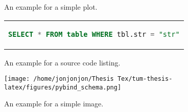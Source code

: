 \begin{figure}[htpb]
  \centering

  \exampleA
  \exampleB
  \caption[Example plot]{An example for a simple plot.}\label{fig:sample-plot}
\end{figure}

\begin{figure}[htpb]
  \centering
  \begin{tabular}{c}
  \begin{lstlisting}[language=SQL]
    SELECT * FROM table WHERE tbl.str = "str"
  \end{lstlisting}
  \end{tabular}
  \caption[Example listing]{An example for a source code listing.}\label{fig:sample-listing}
\end{figure}

\begin{figure}[htpb]
  \centering
  \texttt{[image: /home/jonjonjon/Thesis Tex/tum-thesis-latex/figures/pybind\_schema.png]}
  \caption[Example image]{An example for a simple image.}\label{fig:sample-image}
\end{figure}



